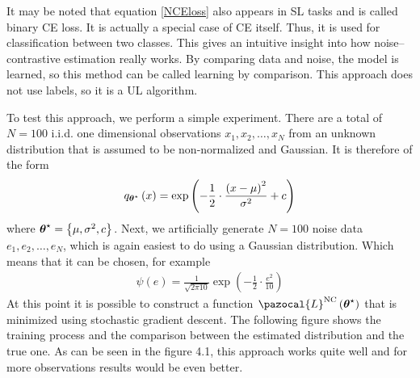 It may be noted that equation \eqref{NCEloss} also appears in SL tasks and is called binary
CE loss. It is actually a special case of CE itself. Thus, it is used for classification between two classes. This gives an intuitive insight into how noise--contrastive estimation
really works. By comparing data and noise, the model is learned, so this method can be called
learning by comparison. This approach does not use labels, so it is a UL algorithm. 
\begin{example}
To test this approach, we perform a simple experiment. There are a total of $N = 100$ i.i.d. one
dimensional observations $x_1,x_2,\dots,x_N$ from an unknown distribution that is assumed to be non-normalized and Gaussian. It is therefore of the form
\begin{align}
    q_{\boldsymbol{\theta}^\star}\left(x\right) = \exp\left(-\frac{1}{2}\cdot\frac{\left(x-\mu\right)^2}{\sigma^2} + c \right)
\end{align}
where $\boldsymbol{\theta}^\star = \left\lbrace \mu, \sigma^2, c \right\rbrace$. Next, we artificially generate $N = 100$ noise data $e_1,e_2,\dots,e_N$, which is again easiest
to do using a Gaussian distribution. Which means that it can be chosen, for example
\begin{align}
    \psi\left(e\right) = \frac{1}{\sqrt{2\pi 10}}\exp\left(-\frac{1}{2}\cdot\frac{e^2}{10} \right)
\end{align}
At this point it is possible to construct a function $\pazocal{L}^{\mathrm{NC}}\left(\bt^\star\right)$ that is minimized using stochastic
gradient descent. The following figure shows the training process and the comparison between
the estimated distribution and the true one. As can be seen in the figure 4.1, this approach works quite well and for more observations results would be even better.
\begin{figure}[h]
	\centering

\end{figure}
\end{example}
